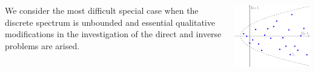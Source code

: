 \documentclass[blockverticalspace=20mm,colspace=20mm,25pt]{tikzposter} %
\begin{document}
\begin{columns}
{%
We consider the most difficult special case when
the discrete spectrum is unbounded and essential qualitative modifications in the investigation of the direct and inverse problems are arised. 
\begin{tikzfigure}
\includegraphics[scale=2]{spectra.pdf}
\end{tikzfigure}
}



\end{columns}
\end{document}
